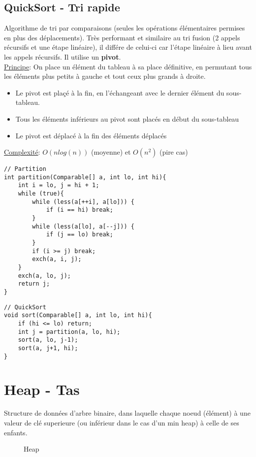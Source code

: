 \documentclass[10pt]{article}
\begin{document}
\subsection{QuickSort - Tri rapide}
Algorithme de tri par comparaisons (seules les opérations élémentaires permises en plus des déplacements). Très performant et similaire au tri fusion (2 appels récursifs et une étape linéaire), il différe de celui-ci car l'étape linéaire à lieu avant les appels récursifs. Il utilise un \textbf{pivot}.
\\\underline{Principe}: On place un élément du tableau à sa place définitive, en permutant tous les éléments plus petits à gauche et tout ceux plus grands à droite.
\begin{itemize}
\item Le pivot est plaçé à la fin, en l'échangeant avec le dernier élément du sous-tableau.
\item Tous les éléments inférieurs au pivot sont placés en début du sous-tableau
\item Le pivot est déplacé à la fin des éléments déplacés
\end{itemize}
\underline{Complexité}: $O(nlog(n))$ (moyenne) et $O(n^2)$ (pire cas)
\\
\begin{verbatim}
// Partition
int partition(Comparable[] a, int lo, int hi){
	int i = lo, j = hi + 1;
	while (true){
		while (less(a[++i], a[lo])) {
			if (i == hi) break;
		}
		while (less(a[lo], a[--j])) {
			if (j == lo) break;
		}
		if (i >= j) break;
		exch(a, i, j);
	}
	exch(a, lo, j);
	return j;
}
\end{verbatim}

\begin{verbatim}
// QuickSort
void sort(Comparable[] a, int lo, int hi){
	if (hi <= lo) return;
	int j = partition(a, lo, hi);
	sort(a, lo, j-1);
	sort(a, j+1, hi);
}
\end{verbatim}

\section{Heap - Tas}
Structure de données d'arbre binaire, dans laquelle chaque noeud (élément) à une valeur de clé superieure (ou inférieur dans le cas d'un min heap) à celle de ses enfants.

\begin{figure}[H]
\caption{Heap}
\label{fig:heap}
\end{figure}
\end{document}
